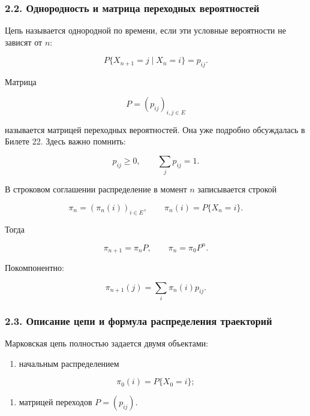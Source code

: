 \documentclass[
  11pt,
  a4paper,
]{article}
\providecommand{\tightlist}{%
  \setlength{\itemsep}{0pt}\setlength{\parskip}{0pt}}
\begin{document}
\subsubsection{2.2. Однородность и матрица переходных
вероятностей}\label{ux43eux434ux43dux43eux440ux43eux434ux43dux43eux441ux442ux44c-ux438-ux43cux430ux442ux440ux438ux446ux430-ux43fux435ux440ux435ux445ux43eux434ux43dux44bux445-ux432ux435ux440ux43eux44fux442ux43dux43eux441ux442ux435ux439}

Цепь называется однородной по времени, если эти условные вероятности не
зависят от \(n\):

\[
P\{X_{n+1}=j\mid X_n=i\}=p_{ij}.
\]

Матрица

\[
P=(p_{ij})_{i,j\in E}
\]

называется матрицей переходных вероятностей. Она уже подробно
обсуждалась в Билете 22. Здесь важно помнить:

\[
p_{ij}\ge0,
\qquad
\sum_jp_{ij}=1.
\]

В строковом соглашении распределение в момент \(n\) записывается строкой

\[
\pi_n=(\pi_n(i))_{i\in E},
\qquad
\pi_n(i)=P\{X_n=i\}.
\]

Тогда

\[
\pi_{n+1}=\pi_nP,
\qquad
\pi_n=\pi_0P^n.
\]

Покомпонентно:

\[
\pi_{n+1}(j)=\sum_i\pi_n(i)p_{ij}.
\]

\subsubsection{2.3. Описание цепи и формула распределения
траекторий}\label{ux43eux43fux438ux441ux430ux43dux438ux435-ux446ux435ux43fux438-ux438-ux444ux43eux440ux43cux443ux43bux430-ux440ux430ux441ux43fux440ux435ux434ux435ux43bux435ux43dux438ux44f-ux442ux440ux430ux435ux43aux442ux43eux440ux438ux439}

Марковская цепь полностью задается двумя объектами:

\begin{enumerate}
\def\labelenumi{\arabic{enumi}.}
\tightlist
\item
  начальным распределением
\end{enumerate}

\[
\pi_0(i)=P\{X_0=i\};
\]

\begin{enumerate}
\def\labelenumi{\arabic{enumi}.}
\setcounter{enumi}{1}
\tightlist
\item
  матрицей переходов \(P=(p_{ij})\).
\end{enumerate}
\end{document}
